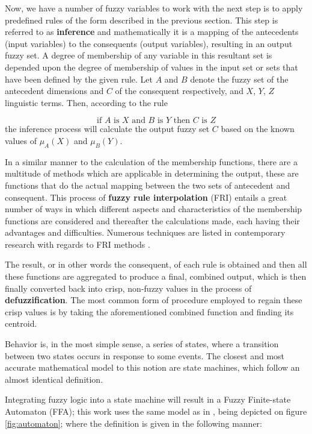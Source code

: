 Now, we have a number of fuzzy variables to work with the next step is to apply predefined rules of the form described in the previous section. This step is referred to as \textbf{inference} and mathematically it is a mapping of the antecedents (input variables) to the consequents (output variables), resulting in an output fuzzy set. A degree of membership of any variable in this resultant set is depended upon the degree of membership of values in the input set or sets that have been defined by the given rule. Let $A$ and $B$ denote the fuzzy set of the antecedent dimensions and $C$ of the consequent respectively, and $X$, $Y$, $Z$ linguistic terms. Then, according to the rule 
	
\[
	\text{if } A \text{ is } X \text{ and } B \text{ is } Y \text{ then } C \text{ is } Z
\]
the inference process will calculate the output fuzzy set $C$ based on the known values of $\mu_A(X)$ and $\mu_B(Y)$.

In a similar manner to the calculation of the membership functions, there are a multitude of methods which are applicable in determining the output, these are functions that do the actual mapping between the two sets of antecedent and consequent. This process of \textbf{fuzzy rule interpolation} (FRI) entails a great number of ways in which different aspects and characteristics of the membership functions are considered and thereafter the calculations made, each having their advantages and difficulties. Numerous techniques are listed in contemporary research with regards to FRI methods \cite{kovacsjohanyak2018}.

The result, or in other words the consequent, of each rule is obtained and then all these functions are aggregated to produce a final, combined output, which is then finally converted back into crisp, non-fuzzy values in the process of \textbf{defuzzification}. The most common form of procedure employed to regain these crisp values is by taking the aforementioned combined function and finding its centroid.

Behavior is, in the most simple sense, a series of states, where a transition between two states occurs in response to some events. The closest and most accurate mathematical model to this notion are state machines, which follow an almost identical definition. 

Integrating fuzzy logic into a state machine will result in a Fuzzy Finite-state Automaton (FFA); this work uses the same model as in \cite{pillerkovacs2015}, being depicted on figure \ref{fig:automaton}; where the definition is given in the following manner:

